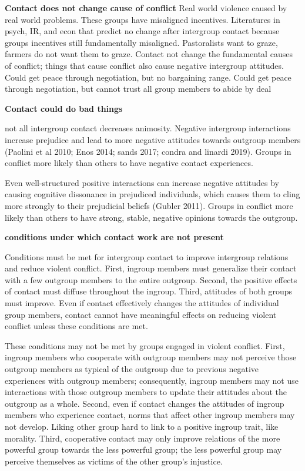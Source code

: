 \documentclass[11pt]{article}
\begin{document}
\textbf{Contact does not change cause of conflict} Real world violence
caused by real world problems. These groups have misaligned incentives.
Literatures in psych, IR, and econ that predict no change after
intergroup contact because groups incentives still fundamentally
misaligned. Pastoralists want to graze, farmers do not want them to
graze. Contact not change the fundamental causes of conflict; things
that cause conflict also cause negative intergroup attitudes. Could get
peace through negotiation, but no bargaining range. Could get peace
through negotiation, but cannot trust all group members to abide by deal

\textbf{Contact could do bad things}

not all intergroup contact decreases animosity. Negative intergroup
interactions increase prejudice and lead to more negative attitudes
towards outgroup members (Paolini et al 2010; Enos 2014; sands 2017;
condra and linardi 2019). Groups in conflict more likely than others to
have negative contact experiences.

Even well-structured positive interactions can increase negative
attitudes by causing cognitive dissonance in prejudiced individuals,
which causes them to cling more strongly to their prejudicial beliefs
(Gubler 2011). Groups in conflict more likely than others to have
strong, stable, negative opinions towards the outgroup.

\textbf{conditions under which contact work are not present}

Conditions must be met for intergroup contact to improve intergroup
relations and reduce violent conflict. First, ingroup members must
generalize their contact with a few outgroup members to the entire
outgroup. Second, the positive effects of contact must diffuse
throughout the ingroup. Third, attitudes of both groups must improve.
Even if contact effectively changes the attitudes of individual group
members, contact cannot have meaningful effects on reducing violent
conflict unless these conditions are met.

These conditions may not be met by groups engaged in violent conflict.
First, ingroup members who cooperate with outgroup members may not
perceive those outgroup members as typical of the outgroup due to
previous negative experiences with outgroup members; consequently,
ingroup members may not use interactions with those outgroup members to
update their attitudes about the outgroup as a whole. Second, even if
contact changes the attitudes of ingroup members who experience contact,
norms that affect other ingroup members may not develop. Liking other
group hard to link to a positive ingroup trait, like morality. Third,
cooperative contact may only improve relations of the more powerful
group towards the less powerful group; the less powerful group may
perceive themselves as victims of the other group's injustice.
\end{document}
